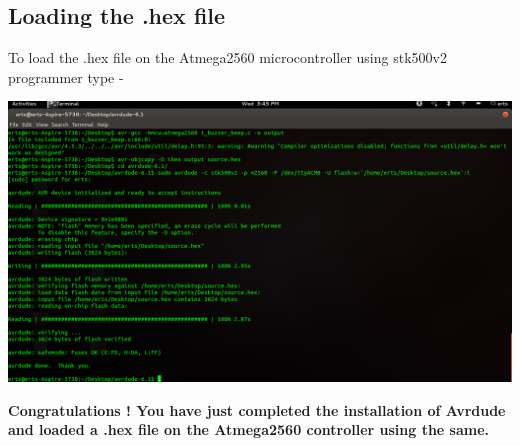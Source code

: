 \begin{flushleft}
\medskip


\subsection{Loading the .hex file}

\medskip

To load the .hex file on the Atmega2560 microcontroller using stk500v2 programmer type - 

\medskip


\medskip

\includegraphics[scale=0.3]{f25}

\medskip

\Large{\textbf{Congratulations ! You have just completed the installation of Avrdude and loaded a .hex file on the Atmega2560 controller using the same.}}

\end{flushleft}

